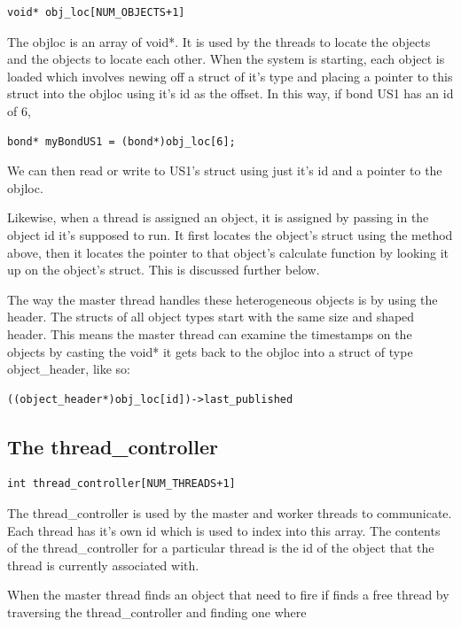 \documentclass{report}
\begin{document}
\begin{verbatim}
void* obj_loc[NUM_OBJECTS+1]
\end{verbatim}

The objloc is an array of void*. It is used by the threads to locate the objects and the objects to locate each other. When the system is starting, each object is loaded which involves newing off a struct of it's type and placing a pointer to this struct into the objloc using it's id as the offset.  In this way, if bond US1 has an id of 6,

\begin{verbatim}
bond* myBondUS1 = (bond*)obj_loc[6];
\end{verbatim}

We can then read or write to US1's struct using just it's id and a pointer to the objloc.

Likewise, when a thread is assigned an object, it is assigned by passing in the object id it's supposed to run. It first locates the object's struct using the method above, then it locates the pointer to that object's 
calculate function by looking it up on the object's struct. This is discussed further below.

The way the master thread handles these heterogeneous objects is by using the header. The structs of all object types start with the same size and shaped header. This means the master thread can examine the timestamps on the objects by casting the void* it gets back to the objloc into a struct of type object_header, like so:

\begin{verbatim}
((object_header*)obj_loc[id])->last_published
\end{verbatim}

\subsection{The thread_controller}

\begin{verbatim}
int thread_controller[NUM_THREADS+1]
\end{verbatim}

The thread_controller is used by the master and worker threads to communicate. Each thread has it's own id which is used to index into this array. The contents of the thread_controller for a particular thread is the id of the object that the thread is currently associated with. 

When the master thread finds an object that need to fire if finds a free thread by traversing the thread_controller and finding one where
\end{document}
